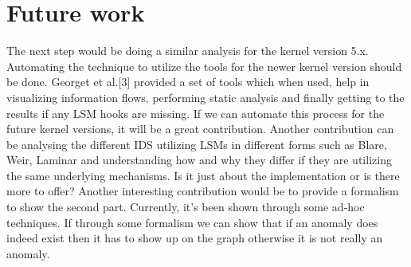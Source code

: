 



\section{Future work}
The next step would be doing a similar analysis for the kernel version 5.x. Automating the technique to utilize the tools for the newer kernel version should be done. Georget et al.[3] provided a set of tools which when used, help in visualizing information flows, performing static analysis and finally getting to the results if any LSM hooks are missing. If we can automate this process for the future kernel versions, it will be a great contribution. 
\vskip 0.1in
Another contribution can be analysing the different IDS utilizing LSMs in different forms such as Blare, Weir, Laminar and understanding how and why they differ if they are utilizing the same underlying mechanisms. Is it just about the implementation or is there more to offer?
\vskip 0.1in
Another interesting contribution would be to provide a formalism to show the second part. Currently, it's been shown through some ad-hoc techniques. If through some formalism we can show that if an anomaly does indeed exist then it has to show up on the graph otherwise it is not really an anomaly.